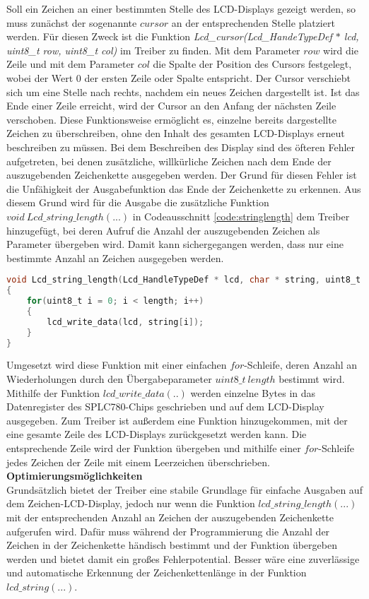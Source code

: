 Soll ein Zeichen an einer bestimmten Stelle des LCD-Displays gezeigt werden, so muss zunächst der sogenannte $cursor$ an der entsprechenden Stelle platziert werden. Für diesen Zweck ist die Funktion \textit{Lcd\_cursor(Lcd\_HandeTypeDef $*$ lcd, uint8\_t row, uint8\_t col)} im Treiber zu finden. Mit dem Parameter $row$ wird die Zeile und mit dem Parameter $col$ die Spalte der Position des Cursors festgelegt, wobei der Wert 0 der ersten Zeile oder Spalte entspricht. Der Cursor verschiebt sich um eine Stelle nach rechts, nachdem ein neues Zeichen dargestellt ist. Ist das Ende einer Zeile erreicht, wird der Cursor an den Anfang der nächsten Zeile verschoben. Diese Funktionsweise ermöglicht es, einzelne bereits dargestellte Zeichen zu überschreiben, ohne den Inhalt des gesamten LCD-Displays erneut beschreiben zu müssen.
\newline
Bei dem Beschreiben des Display sind des öfteren Fehler aufgetreten, bei denen zusätzliche, willkürliche Zeichen nach dem Ende der auszugebenden Zeichenkette ausgegeben werden. Der Grund für diesen Fehler ist die Unfähigkeit der Ausgabefunktion das Ende der Zeichenkette zu erkennen. Aus diesem Grund wird für die Ausgabe die zusätzliche Funktion $void\ Lcd\_string\_length(...)$ in Codeausschnitt \ref{code:stringlength} dem Treiber hinzugefügt, bei deren Aufruf die Anzahl der auszugebenden Zeichen als Parameter übergeben wird. Damit kann sichergegangen werden, dass nur eine bestimmte Anzahl an Zeichen ausgegeben werden.
\begin{lstlisting}[firstnumber=95, language=C, caption = lcd.c: Funktion Lcd\_string\_length(...), label = code:stringlength]
void Lcd_string_length(Lcd_HandleTypeDef * lcd, char * string, uint8_t length)
{
	for(uint8_t i = 0; i < length; i++)
	{
		lcd_write_data(lcd, string[i]);
	}
}
\end{lstlisting}
Umgesetzt wird diese Funktion mit einer einfachen $for$-Schleife, deren Anzahl an Wiederholungen durch den Übergabeparameter $uint8\_t\ length$ bestimmt wird. Mithilfe der Funktion $lcd\_write\_data(..)$ werden einzelne Bytes in das Datenregister des SPLC780-Chips geschrieben und auf dem LCD-Display ausgegeben.
Zum Treiber ist außerdem eine Funktion hinzugekommen, mit der eine gesamte Zeile des LCD-Displays zurückgesetzt werden kann. Die entsprechende Zeile wird der Funktion übergeben und mithilfe einer $for$-Schleife jedes Zeichen der Zeile mit einem Leerzeichen überschrieben.\\
\newline
\textbf{Optimierungsmöglichkeiten}\\
Grundsätzlich bietet der Treiber eine stabile Grundlage für einfache Ausgaben auf dem Zeichen-LCD-Display, jedoch nur wenn die Funktion $lcd\_string\_length(...)$ mit der entsprechenden Anzahl an Zeichen der auszugebenden Zeichenkette aufgerufen wird. Dafür muss während der Programmierung die Anzahl der Zeichen in der Zeichenkette händisch bestimmt und der Funktion übergeben werden und bietet damit ein großes Fehlerpotential. Besser wäre eine zuverlässige und automatische Erkennung der Zeichenkettenlänge in der Funktion $lcd\_string(...)$.